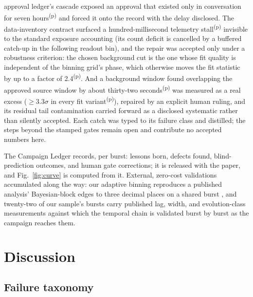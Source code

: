 \documentclass[twocolumn]{aastex631}
\newcommand{\prov}{\textsuperscript{(p)}}   %
\begin{document}
approval ledger's cascade exposed an approval that existed only in
conversation for seven hours\prov{} and forced it onto the record with
the delay disclosed. The data-inventory contract surfaced a
hundred-millisecond telemetry stall\prov{} invisible to the standard
exposure accounting (its count deficit is cancelled by a buffered
catch-up in the following readout bin), and the repair was accepted only
under a robustness criterion: the chosen background cut is the one whose
fit quality is independent of the binning grid's phase, which otherwise
moves the fit statistic by up to a factor of 2.4\prov. And a background
window found overlapping the approved source window by about thirty-two
seconds\prov{} was measured as a real excess ($\geq\!3.3\sigma$ in every
fit variant\prov), repaired by an explicit human ruling, and its residual
tail contamination carried forward as a disclosed systematic rather than
silently accepted. Each catch was typed to its failure class and
distilled; the steps beyond the stamped gates remain open and contribute
no accepted numbers here.

The Campaign Ledger records, per burst: lessons born, defects found,
blind-prediction outcomes, and human gate corrections; it is released with
the paper, and Fig.~\ref{fig:curve} is computed from it. External,
zero-cost validations accumulated along the way: our adaptive binning
reproduces a published analysis' Bayesian-block edges to three decimal
places on a shared burst \citep{2021ApJS..253...43L}, and twenty-two of our sample's bursts carry
published lag, width, and evolution-class measurements \citep{2018ApJ...865..153L} against which the
temporal chain is validated burst by burst as the campaign reaches them.

\section{Discussion} \label{sec:discussion}
\subsection{Failure taxonomy} \label{sec:failures}
\end{document}
